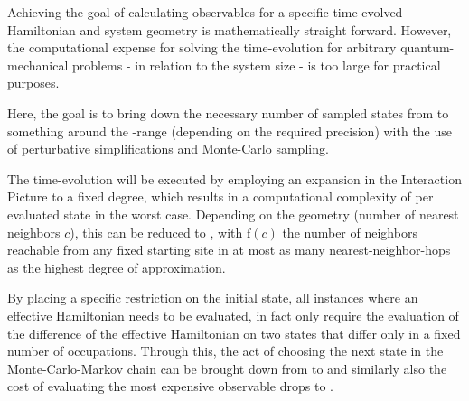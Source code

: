 Achieving the goal of calculating observables for a specific time-evolved Hamiltonian and system geometry is mathematically straight forward.
However, the computational expense for solving the time-evolution for arbitrary quantum-mechanical problems - in relation to the system size - is too large for practical purposes.

Here, the goal is to bring down the necessary number of sampled states from  to something around the -range (depending on the required precision) with the use of perturbative simplifications and Monte-Carlo sampling. 

The time-evolution will be executed by employing an expansion in the Interaction Picture to a fixed degree, which results in a computational complexity of  per evaluated state in the worst case.
Depending on the geometry (number of nearest neighbors $c$), this can be reduced to , with $\mathrm{f}(c)$ the number of neighbors reachable from any fixed starting site in at most as many nearest-neighbor-hops as the highest degree of approximation.

By placing a specific restriction on the initial state, all instances where an effective Hamiltonian needs to be evaluated, in fact only require the evaluation of the difference of the effective Hamiltonian on two states that differ only in a fixed number of occupations.
Through this, the act of choosing the next state in the Monte-Carlo-Markov chain can be brought down from  to  and similarly also the cost of evaluating the most expensive observable drops to .